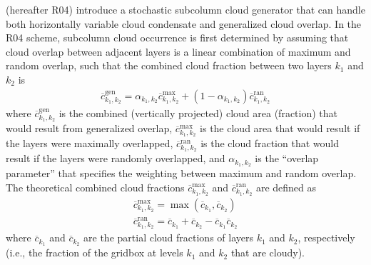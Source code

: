 \citet{raisanen_et_al_2004} (hereafter R04) introduce a stochastic
subcolumn cloud generator that can handle both horizontally variable
cloud condensate and generalized cloud overlap. In the R04 scheme,
subcolumn cloud occurrence is first determined by assuming that cloud
overlap between adjacent layers is a linear combination of maximum and
random overlap, such that the combined cloud fraction between two layers
\(k_1\) and \(k_2\) is \begin{equation}\begin{gathered}
\overline{c}_{k_1, k_2}^\textrm{gen} = \alpha_{k_1, k_2} \overline{c}_{k_1,
k_2}^\textrm{max} + (1 - \alpha_{k_1, k_2}) \overline{c}_{k_1, k_2}^\textrm{ran}
\end{gathered}\label{eq:generalized_overlap_equation}\end{equation}
where \(\overline{c}_{k_1, k_2}^\textrm{gen}\) is the combined
(vertically projected) cloud area (fraction) that would result from
generalized overlap, \(\overline{c}_{k_1, k_2}^\textrm{max}\) is the
cloud area that would result if the layers were maximally overlapped,
\(\overline{c}_{k_1, k_2}^\textrm{ran}\) is the cloud fraction that
would result if the layers were randomly overlapped, and
\(\alpha_{k_1, k_2}\) is the ``overlap parameter'' that specifies the
weighting between maximum and random overlap. The theoretical combined
cloud fractions \(\overline{c}^\textrm{max}_{k_1, k_2}\) and
\(\overline{c}^\textrm{ran}_{k_1, k_2}\) are defined as
\[\begin{gathered} \overline{c}^\textrm{max}_{k_1, k_2} =
\max(\overline{c}_{k_1},\overline{ c}_{k_2}) \\ \overline{c}^\textrm{ran}_{k_1,
k_2} = \overline{c}_{k_1} + \overline{c}_{k_2} - \overline{c}_{k_1}
\overline{c}_{k_2}\end{gathered}\] where \(\overline{c}_{k_1}\) and
\(\overline{c}_{k_2}\) are the partial cloud fractions of layers \(k_1\)
and \(k_2\), respectively (i.e., the fraction of the gridbox at levels
\(k_1\) and \(k_2\) that are cloudy).

